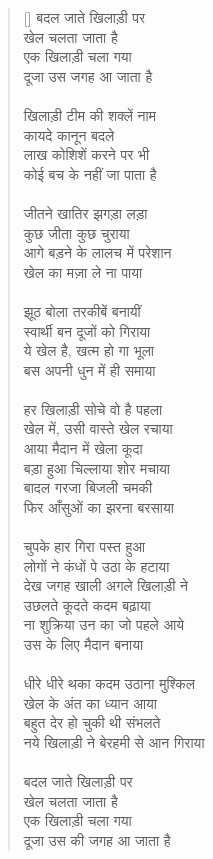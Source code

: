 \begin{verse}[\versewidth]\texthindi{
बदल जाते खिलाड़ी पर\\
खेल चलता जाता है\\
एक खिलाड़ी चला गया\\
दूजा उस जगह आ जाता है\\
\\
खिलाड़ी टीम की शक्लें नाम\\
कायदे कानून बदले\\
लाख कोशिशें करने पर भी\\
कोई बच के नहीं जा पाता है\\
\\
जीतने खातिर झगड़ा लड़ा\\
कुछ जीता कुछ चुराया\\
आगे बड़ने के लालच में परेशान\\
खेल का मज़ा ले ना पाया\\
\\
झूठ बोला तरकीबें बनायीं\\
स्वार्थी बन दूजों को गिराया\\
ये खेल है, खत्म हो गा भूला\\
बस अपनी धुन में ही समाया\\
\\
हर खिलाड़ी सोचे वो है पहला \\
खेल में, उसी वास्ते खेल रचाया\\
आया मैदान में खेला कूदा\\
बड़ा हुआ चिल्लाया शोर मचाया\\
बादल गरजा बिजली चमकी\\
फिर आँसुओं का झरना बरसाया\\
\\
चुपके हार गिरा पस्त हुआ\\
लोगों ने कंधों पे उठा के हटाया\\
देख जगह खाली अगले खिलाड़ी ने\\
उछलते कूदते कदम बढ़ाया\\
ना शुक्रिया उन का जो पहले आये\\
उस के लिए मैदान बनाया\\
\\
धीरे धीरे थका कदम उठाना मुश्किल\\
खेल के अंत का ध्यान आया \\
बहुत देर हो चुकी थी संभलते\\
नये खिलाड़ी ने बेरहमी से आन गिराया\\
\\
बदल जाते खिलाड़ी पर\\
खेल चलता जाता है\\
एक खिलाड़ी चला गया\\
दूजा उस की जगह आ जाता है
}\end{verse}

